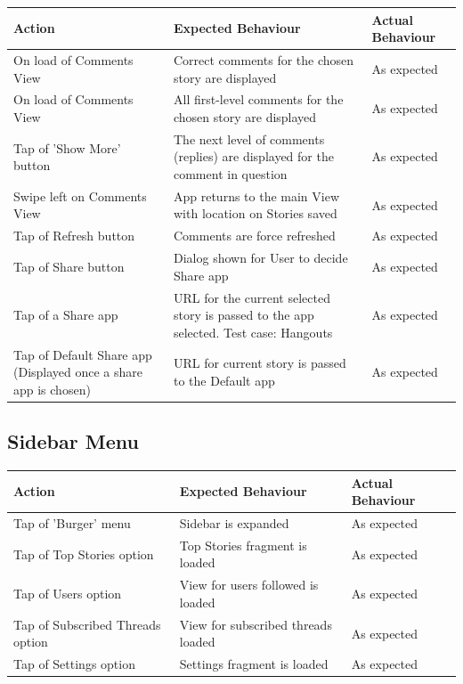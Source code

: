 \documentclass[11pt]{article}
\begin{document}
\begin{center}
\begin{tabular}{ | p{5cm} | p{5cm} | p{5cm} |}
	\hline
	\textbf{Action} & \textbf{Expected Behaviour} & \textbf{Actual Behaviour} \\
	\hline
	On load of Comments View & Correct comments for the chosen story are displayed & As expected \\
	\hline
	On load of Comments View & All first-level comments for the chosen story are displayed & As expected \\
	\hline
	Tap of 'Show More' button & The next level of comments (replies) are displayed for the comment in question & As expected \\
	\hline
	Swipe left on Comments View & App returns to the main View with location on Stories saved & As expected \\
	\hline
	Tap of Refresh button & Comments are force refreshed & As expected \\
	\hline
	Tap of Share button & Dialog shown for User to decide Share app & As expected \\
	\hline
	Tap of a Share app & URL for the current selected story is passed to the app selected. Test case: Hangouts & As expected \\
	\hline
	Tap of Default Share app (Displayed once a share app is chosen) & URL for current story is passed to the Default app & As expected \\
	\hline
\end{tabular}
\end{center}

\subsection*{Sidebar Menu}
\begin{center}
\begin{tabular}{ | p{5cm} | p{5cm} | p{5cm} |}
	\hline
	\textbf{Action} & \textbf{Expected Behaviour} & \textbf{Actual Behaviour} \\
	\hline
	Tap of 'Burger' menu & Sidebar is expanded & As expected \\
	\hline
	Tap of Top Stories option & Top Stories fragment is loaded & As expected \\
	\hline
	Tap of Users option & View for users followed is loaded & As expected \\
	\hline
	Tap of Subscribed Threads option & View for subscribed threads loaded & As expected \\
	\hline
	Tap of Settings option & Settings fragment is loaded & As expected \\
	\hline
\end{tabular}
\end{center}
\end{document}
